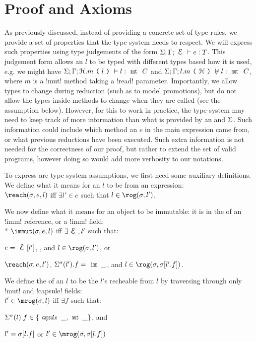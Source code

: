 \section{Proof and Axioms}
\label{s:proof}

As previously discussed, instead of providing a concrete set of type rules, we provide a set of properties that the type system needs to respect.
We will express such properties using type judgements of the form $\ty{e}{T}$. This judgement form allows an $l$ to be typed with different types based how it is used, e.g. we might have $\S;\G;\h.m\oR l \cR \vdash l : \Kw{mut}\ C$  and $\S;\G;l.m\oR \h \cR \nvdash l : \Kw{mut}\ C$, where $m$ is a \Q!mut! method taking a \Q!read! parameter. Importantly, we allow types to change during reduction (such as to model promotions), but do not allow the types inside methods to change when they are called (see the  assumption below). However, for this to work in practice, the type-system may need to keep track of more information than what is provided by an \E and $\S$. Such information could include which method an $e$ in the main expression came from, or what previous reductions have been executed. Such extra information is not needed for the correctness of our proof, but rather to extend the set of valid programs, however doing so would add more verbosity to our notations.

To express are type system assumptions, we first need some auxiliary definitions. We define what it means for an $l$ to be \reach from an expression:\\
\indent $\reach(\s, e, l)$ iff $\exists l' \in e$ such that $l \in \rog(\s, l')$.

\noindent We now define what it means for an object to be immutable: it is in the \rog of an \Q!imm! reference, or a \reach \Q!imm! field:\\*
\indent $\immut(\s, e, l)$ iff $\exists \E, l'$ such that:
\begin{iitemize}
\item $e = \E[l']$, , and $l \in \rog(\s, l')$, or
\item $\reach(\s, e, l')$, $\Ss(l').f = \Kw{imm}\,\_$, and $l \in \rog(\s, \s[l'.f])$.
\end{iitemize}

\noindent We define the \mrog of an $l$ to be the $l'$s recheable from $l$ by traversing through only \Q!mut! and \Q!capsule! fields:\\
\indent $l' \in \mrog(\s, l)$ iff $\exists f$ such that:
\begin{iitemize}
	\item $\Ss(l).f \in \{\Kw{capsule}\,\_, \Kw{mut}\,\_\}$, and
	\item $l' = \s[l.f]$ or $l' \in \mrog(\s, \s[l.f])$
\end{iitemize}

